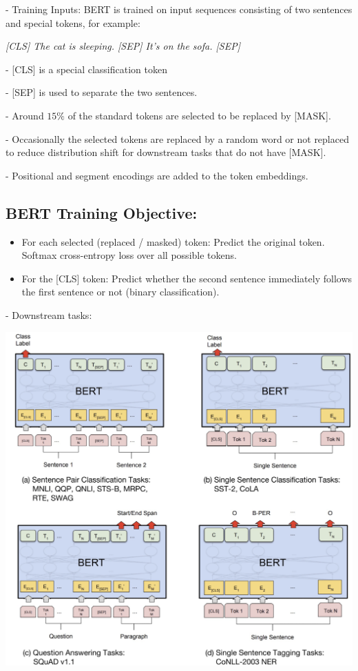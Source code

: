 - Training Inputs: BERT is trained on input sequences consisting of two sentences and special tokens, for example:

\textit{
[CLS] The cat is sleeping. [SEP] It's on the sofa. [SEP]
}

- [CLS] is a special classification token 

- [SEP] is used to separate the two sentences. 

- Around $15 \%$ of the standard tokens are selected to be replaced by [MASK]. 

- Occasionally the selected tokens are replaced by a random word or not replaced to reduce distribution shift for downstream tasks that do not have [MASK]. 

- Positional and segment encodings are added to the token embeddings.

\subsection*{BERT Training Objective:}
\begin{itemize}
  \item For each selected (replaced / masked) token: Predict the original token. Softmax cross-entropy loss over all possible tokens.
  \item For the [CLS] token: Predict whether the second sentence immediately follows the first sentence or not (binary classification).
\end{itemize}

- Downstream tasks:

\includegraphics*[width=\columnwidth]{figures/BERT_tasks.png}

